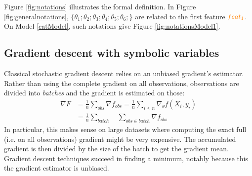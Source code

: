Figure \ref{fig:notations} illustrates the formal definition. In Figure \ref{fig:generalnotations}, $\{ \theta_1 ;  \theta_2 ;  \theta_3 ;  \theta_4 ;  \theta_5 ;  \theta_6 ; \}$ are related to the first feature $\textcolor{orange}{feat_1}$. On Model \ref{catModel}, such notations give Figure \ref{fig:notationsModel1}.




\subsection{Gradient descent with symbolic variables}\label{sec:motication}
Classical stochastic gradient descent relies on an unbiased gradient's estimator. Rather than using the complete gradient on all observations, observations are divided into \textit{batches} and the gradient is estimated on those:
\begin{align}
\nabla F &=  \frac{1}{n} \sum_{obs} \nabla f_{obs}  = \frac{1}{n} \sum_{i \leq n} \nabla_{\theta} f(X_i, y_i)     \\
         &= \frac{1}{n} \sum_{batch} \quad \sum_{obs \in batch} \nabla f_{obs}
\end{align}
In particular, this makes sense on large datasets where computing the exact full (i.e. on all observations) gradient might be very expensive.
The accumulated gradient is then divided by the size of the batch to get the gradient mean. Gradient descent techniques succeed in finding a minimum, notably because this the gradient estimator is unbiased. 


